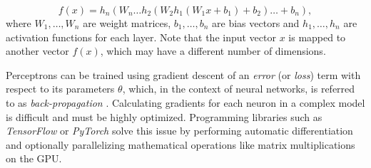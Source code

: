\begin{equation*}
    f(x) = h_n \left(W_n \dots h_2\left( W_2 h_1(W_1x + b_1) + b_2 \right) \dots + b_n\right),
\end{equation*}
where $W_1, \dots, W_n$ are weight matrices, $b_1, \dots, b_n$ are bias vectors and $h_1, \dots, h_n$ are activation functions for each layer. Note that the input vector $x$ is mapped to another vector $f(x)$, which may have a different number of dimensions.

Perceptrons can be trained using gradient descent of an \textit{error} (or \textit{loss}) term with respect to its parameters $\theta$, which, in the context of neural networks, is referred to as \textit{back-propagation} \cite{back-propagation}. Calculating gradients for each neuron in a complex model is difficult and must be highly optimized. Programming libraries such as \mbox{\textit{TensorFlow}} \cite{tensorflow} or \textit{PyTorch} \cite{pytorch} solve this issue by performing automatic differentiation and optionally parallelizing mathematical operations like matrix multiplications on the GPU.
